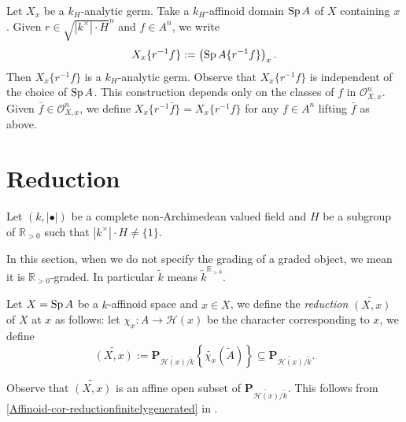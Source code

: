 \begin{example}
    Let $X_x$ be a $k_H$-analytic germ. Take a $k_H$-affinoid domain $\operatorname{Sp} A$ of $X$ containing $x$.
    Given $r\in \sqrt{|k^{\times}|\cdot H}^n$ and $f\in A^n$, we write
    \[
        X_x\{r^{-1}f\}:=\left(\operatorname{Sp} A\{r^{-1}f\}\right)_x.
    \]
    Then $X_x\{r^{-1}f\}$ is a $k_H$-analytic germ. Observe that $X_x\{r^{-1}f\}$ is independent of the choice of $\operatorname{Sp} A$. This construction depends only on the classes of $f$ in $\mathcal{O}_{X,x}^n$. Given $\bar{f}\in \mathcal{O}_{X,x}^n$, we define $X_x\{r^{-1}\bar{f}\}=X_x\{r^{-1}f\}$ for any $f\in A^n$ lifting $\bar{f}$ as above.
\end{example}

\section{Reduction}
Let $(k,|\bullet|)$ be a complete non-Archimedean valued field and $H$ be a subgroup of $\mathbb{R}_{>0}$ such that $|k^{\times}|\cdot H\neq \{1\}$.

In this section, when we do not specify the grading of a graded object, we mean it is $\mathbb{R}_{>0}$-graded. In particular $\tilde{k}$ means $\tilde{k}^{\mathbb{R}_{>0}}$.


\begin{definition}\label{def-reductionstar}
    Let $X=\operatorname{Sp} A$ be a $k$-affinoid space and $x\in X$, we define the \emph{reduction} $\widetilde{(X,x)}$ of $X$ at $x$ as follows: let $\chi_x:A\rightarrow \mathscr{H}(x)$ be the character corresponding to $x$, we define
    \[
        \widetilde{(X,x)}:=\mathbf{P}_{\widetilde{\mathscr{H}(x)}/\tilde{k}}\left\{ \widetilde{\chi_x}(\tilde{A})\right\}\subseteq \mathbf{P}_{\widetilde{\mathscr{H}(x)}/\tilde{k}}.
    \]
\end{definition}
Observe that $\widetilde{(X,x)}$ is an affine open subset of $\mathbf{P}_{\widetilde{\mathscr{H}(x)}/\tilde{k}}$. This follows from \cref{Affinoid-cor-reductionfinitelygenerated} in .

